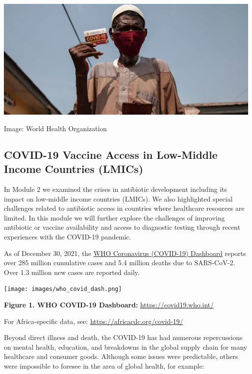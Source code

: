 \documentclass[
  11pt,
  paper=a4,
  ,captions=tableheading
]{scrartcl}
\begin{document}
\includegraphics[width=6.25in,height=\textheight]{images/COVID_vaccination-01.png}

Image: World Health Organization

\hypertarget{covid-19-vaccine-access-in-low-middle-income-countries-lmics}{%
\subsection*{COVID-19 Vaccine Access in Low-Middle Income Countries
(LMICs)}\label{covid-19-vaccine-access-in-low-middle-income-countries-lmics}}

In Module 2 we examined the crises in antibiotic development including
its impact on low-middle income countries (LMICs). We also highlighted
special challenges related to antibiotic access in countries where
healthcare resources are limited. In this module we will further explore
the challenges of improving antibiotic or vaccine availability and
access to diagnostic testing through recent experiences with the
COVID-19 pandemic.

As of December 30, 2021, the \href{https://covid19.who.int/}{WHO
Coronavirus (COVID-19) Dashboard} reports over 285 million cumulative
cases and 5.4 million deaths due to SARS-CoV-2. Over 1.3 million new
cases are reported daily.

\texttt{[image: images/who\_covid\_dash.png]}

\textbf{Figure 1. WHO COVID-19 Dashboard:}
\url{https://covid19.who.int/}

For Africa-specific data, see: \url{https://africacdc.org/covid-19/}

Beyond direct illness and death, the COVID-19 has had numerous
repercussions on mental health, education, and breakdowns in the global
supply chain for many healthcare and consumer goods. Although some
issues were predictable, others were impossible to foresee in the area
of global health, for example:
\end{document}
